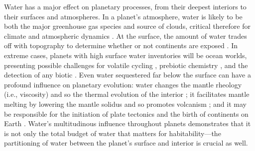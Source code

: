 \documentclass[fleqn,usenatbib]{mnras}
\begin{document}
Water has a major effect on planetary processes, from their deepest interiors to their surfaces and atmospheres. In a planet's atmosphere, water is likely to be both the major greenhouse gas species and source of clouds, critical therefore for climate and atmospheric dynamics \citep[e.g.,][]{pierrehumbert_thermostats_1995,frierson_gray-radiation_2006,frierson_gray-radiation_2007}. At the surface, the amount of water trades off with topography to determine whether or not continents are exposed \citep{cowan_water_2014, honing_continental_2016, guimond_blue_2022}. In extreme cases, planets with high surface water inventories will be ocean worlds, presenting possible challenges for volatile cycling \citep{kitzmann_unstable_2015, noack_water-rich_2016, nakayama_runaway_2019, honing_carbon_2019, krissansen-totton_waterworlds_2021}, prebiotic chemistry \citep{patel_common_2015, rimmer_origin_2018}, and the detection of any biotic  \citep{glaser_detectability_2020, krissansen-totton_oxygen_2021}. Even water sequestered far below the surface can have a profound influence on planetary evolution: water changes the mantle rheology (i.e., viscosity) and so the thermal evolution of the interior \citep{karato_rheology_1993, seales_deep_2020}; it facilitates mantle melting by lowering the mantle solidus and so promotes volcanism \citep{green_experimental_1973, katz_new_2003}; and it may be responsible for the initiation of plate tectonics and the birth of continents on Earth \citep{korenaga_initiation_2013}. Water's multitudinous influence throughout planets demonstrates that it is not only the total budget of water that matters for habitability---the partitioning of water between the planet's surface and interior is crucial as well.
\end{document}
